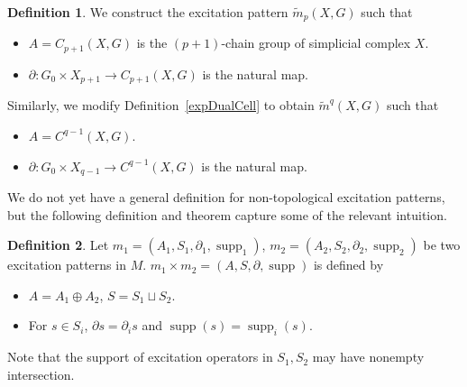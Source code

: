 \documentclass[reprint, amsmath, amssymb, showpacs, floatfix, longbibliography, aps, twocolumn, superscriptaddress, nofootinbib]{revtex4-2}
\newcommand{\supp}{\operatorname{supp}}
\theoremstyle{definition}
\newtheorem{definition}{Definition}[section]
\begin{document}
\begin{definition}
	We construct the excitation pattern $\tilde{m}_p(X,G)$ such that
	\begin{itemize}
		\item $A=C_{p+1}(X,G)$ is the $(p+1)$-chain group of simplicial complex $X$.
		\item $\partial:G_0\times X_{p+1} \rightarrow C_{p+1}(X,G)$ is the natural map.
	\end{itemize}
	Similarly, we modify Definition~\ref{expDualCell} to obtain
	$\tilde{m}^q(X,G)$ such that
	\begin{itemize}
		\item $A=C^{q-1}(X,G)$.
		\item $\partial:G_0\times X_{q-1} \rightarrow C^{q-1}(X,G)$ is the natural map.
	\end{itemize}
\end{definition}

 We do not yet have a general definition for non-topological excitation patterns, but the following definition and theorem capture some of the relevant intuition.
 
\begin{definition}\label{constructionSum}
	Let $m_1=(A_1,S_1,\partial_1,\supp_1)$, $m_2=(A_2,S_2,\partial_2,\supp_2)$ be two excitation patterns in $M$. $m_1\times m_2=(A,S,\partial,\supp)$ is defined by
	\begin{itemize}
		\item $A=A_1\oplus A_2$, $S=S_1\sqcup S_2$.
		\item For $s\in S_i$, $\partial s=\partial_is$ and $\supp(s)=\supp_i(s)$.
	\end{itemize}
	Note that the support of excitation operators in $S_1,S_2$ may have nonempty intersection.
\end{definition}
\end{document}
